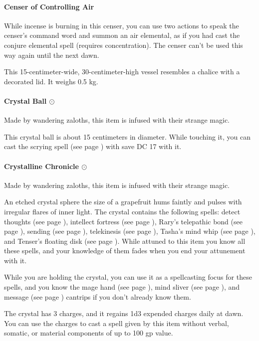 \paragraph{Censer of Controlling Air}
    While incense is burning in this censer, you can use two actions to speak the censer's command word and summon an air elemental, as if you had cast the conjure elemental spell (requires concentration).
    The censer can't be used this way again until the next dawn.

    This 15-centimeter-wide, 30-centimeter-high vessel resembles a chalice with a decorated lid.
    It weighs 0.5 kg.
\paragraph{Crystal Ball $\odot$}
    Made by wandering zaloths, this item is infused with their strange magic.

    This crystal ball is about 15 centimeters in diameter.
    While touching it, you can cast the scrying spell (see page \pageref{spell::scrying}) with save DC 17 with it.
\paragraph{Crystalline Chronicle $\odot$}
    Made by wandering zaloths, this item is infused with their strange magic.

    An etched crystal sphere the size of a grapefruit hums faintly and pulses with irregular flares of inner light.
    The crystal contains the following spells: detect thoughts (see page \pageref{spell::detectthoughts}), intellect fortress (see page \pageref{spell::intellectfortress}), Rary's telepathic bond (see page \pageref{spell::rarystelepathicbond}), sending (see page \pageref{spell::sending}), telekinesis (see page \pageref{spell::telekinesis}), Tasha's mind whip (see page \pageref{spell::tashasmindwhip}), and Tenser's floating disk (see page \pageref{spell::tensersfloatingdisc}).
    While attuned to this item you know all these spells, and your knowledge of them fades when you end your attunement with it.

    While you are holding the crystal, you can use it as a spellcasting focus for these spells, and you know the mage hand (see page \pageref{spell::magehand}), mind sliver (see page \pageref{spell::mindsliver}), and message (see page \pageref{spell::message}) cantrips if you don't already know them.

    The crystal has 3 charges, and it regains 1d3 expended charges daily at dawn.
    You can use the charges to cast a spell given by this item without verbal, somatic, or material components of up to 100 gp value.

